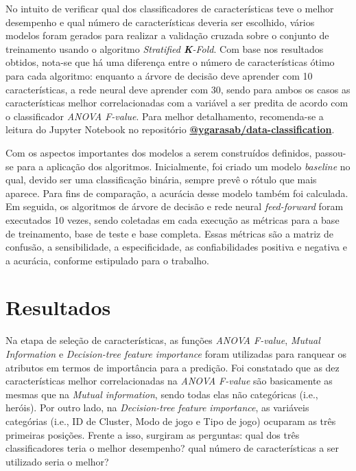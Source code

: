 \documentclass[12pt]{article}
\begin{document}
No intuito de verificar qual dos classificadores de características teve o melhor desempenho e qual número de características deveria ser escolhido, vários modelos foram gerados para realizar a validação cruzada sobre o conjunto de treinamento usando o algoritmo \textit{Stratified \textbf{K}-Fold}. Com base nos resultados obtidos, nota-se que há uma diferença entre o número de características ótimo para cada algoritmo: enquanto a árvore de decisão deve aprender com 10 características, a rede neural deve aprender com 30, sendo para ambos os casos as características melhor correlacionadas com a variável a ser predita de acordo com o classificador \textit{ANOVA F-value}. Para melhor detalhamento, recomenda-se a leitura do Jupyter Notebook no repositório \textbf{\href{https://github.com/ygarasab/data-classification}{@ygarasab/data-classification}}.

Com os aspectos importantes dos modelos a serem construídos definidos, passou-se para a aplicação dos algoritmos. Inicialmente, foi criado um modelo \textit{baseline} no qual, devido ser uma classificação binária, sempre prevê o rótulo que mais aparece. Para fins de comparação, a acurácia desse modelo também foi calculada. Em seguida, os algoritmos de árvore de decisão e rede neural \textit{feed-forward} foram executados 10 vezes, sendo coletadas em cada execução as métricas para a base de treinamento, base de teste e base completa. Essas métricas são a matriz de confusão, a sensibilidade, a especificidade, as confiabilidades positiva e negativa e a acurácia, conforme estipulado para o trabalho. 
	
\section{Resultados}\label{sec:resultados}
Na etapa de seleção de características, as funções \textit{ANOVA F-value}, \textit{Mutual Information} e \textit{Decision-tree feature importance} foram utilizadas para ranquear os atributos em termos de importância para a predição. Foi constatado que as dez características melhor correlacionadas na \textit{ANOVA F-value} são basicamente as mesmas que na \textit{Mutual information}, sendo todas elas não categóricas (i.e., heróis). Por outro lado, na \textit{Decision-tree feature importance}, as variáveis categórias (i.e., ID de Cluster, Modo de jogo e Tipo de jogo) ocuparam as três primeiras posições. Frente a isso, surgiram as perguntas: qual dos três classificadores teria o melhor desempenho? qual número de características a ser utilizado seria o melhor?
\end{document}
